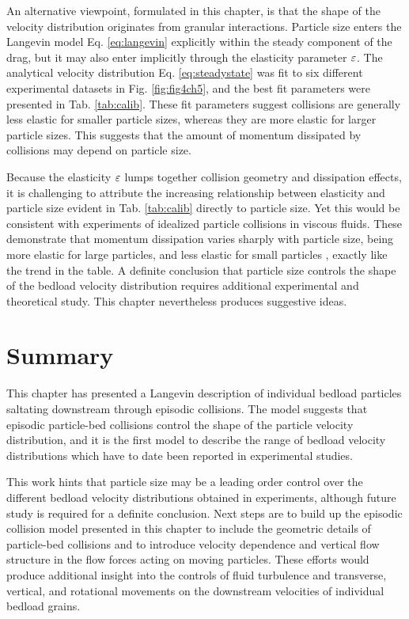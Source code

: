 An alternative viewpoint, formulated in this chapter, is that the shape of the velocity distribution originates from granular interactions.
Particle size enters the Langevin model Eq. \ref{eq:langevin} explicitly within the steady component of the drag, but it may also enter implicitly through the elasticity parameter $\varepsilon$.
The analytical velocity distribution Eq. \ref{eq:steadystate} was fit to six different experimental datasets in Fig. \ref{fig:fig4ch5}, and the best fit parameters were presented in Tab. \ref{tab:calib}.
These fit parameters suggest collisions are generally less elastic for smaller particle sizes, whereas they are more elastic for larger particle sizes. This suggests that the amount of momentum dissipated by collisions may depend on particle size.

Because the elasticity $\varepsilon$ lumps together collision geometry and dissipation effects, it is challenging to attribute the increasing relationship between elasticity and particle size evident in Tab. \ref{tab:calib} directly to particle size.
Yet this would be consistent with experiments of idealized particle collisions in viscous fluids. These demonstrate that momentum dissipation varies sharply with particle size, being more elastic for large particles, and less elastic for small particles \citep{Joseph2001,Yang2006,Schmeeckle2001}, exactly like the trend in the table.
A definite conclusion that particle size controls the shape of the bedload velocity distribution requires additional experimental and theoretical study. This chapter nevertheless produces suggestive ideas.

\section{Summary}
\label{sec:langconclusion}
This chapter has presented a Langevin description of individual bedload particles saltating downstream through episodic collisions.
The model suggests that episodic particle-bed collisions control the shape of the particle velocity distribution, and it is the first model to describe the range of bedload velocity distributions which have to date been reported in experimental studies.

This work hints that particle size may be a leading order control over the different bedload velocity distributions obtained in experiments, although future study is required for a definite conclusion.
Next steps are to build up the episodic collision model presented in this chapter to include the geometric details of particle-bed collisions and to introduce velocity dependence and vertical flow structure in the flow forces acting on moving particles.
These efforts would produce additional insight into the controls of fluid turbulence and transverse, vertical, and rotational movements on the downstream velocities of individual bedload grains.

